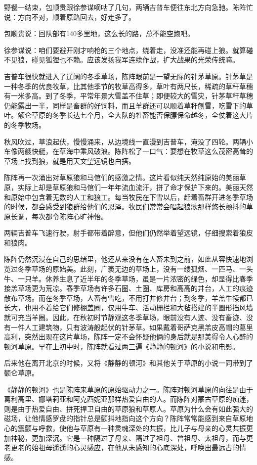 \par 野餐一结束，包顺贵跟徐参谋嘀咕了几句，两辆吉普车便往东北方向急驰。陈阵忙说：方向不对，顺着原路回去，好走多了。
\par 包顺贵说：回队部有140多里地，这么长的路，总不能空跑吧。
\par 徐参谋说：咱们要避开刚才响枪的三个地点，绕着走，没准还能再碰上狼。就算碰不见狼，碰见狐狸也不赖。应该发扬我军连续作战，扩大战果的光荣传统嘛。
\par 吉普车很快就进入了辽阔的冬季草场，陈阵眼前是一望无际的针茅草原。针茅草是一种冬季的优良牧草，比其他季节的牧草高得多，草叶有两尺长，稀疏的草秆草穗有一米多高。到了冬季，平常年景大雪盖不住草；即便较大的雪灾，针茅草秆草穗仍能露出一半，同样是畜群的好饲料，而且羊群还可以顺着草秆刨雪，吃雪下的草叶。额仑草原的冬季长达七个月，全大队的牲畜能否保膘保命越冬，全仗着这大片的冬季牧场。
\par 秋风吹过，草浪起伏，慢慢涌来，从边境线一直漫到吉普车，淹没了四轮。两辆小车像两艘快艇，在草海中乘风破浪。陈阵松了一口气：要想在牧草这么茂密高耸的草场上找到狼，就是用天文望远镜也白搭。
\par 陈阵再一次涌出对草原狼和马倌们的感激之情。这片看似纯天然纯原始的美丽草原，实际上却是草原狼和马倌们一年年流血流汗，拼了命才保护下来的。美丽天然和原始中包含着无数的人工和狼工。每当牧民在下雪以后，赶着畜群开进冬季草场的时候，都会感受到狼群给他们的恩泽。牧民们常常会唱起狼歌那样悠长颤抖的草原长调，每次都令陈阵心旷神怡。
\par 两辆吉普车飞速行驶，射手都带着醉意，但他们仍然举着望远镜，仔细搜索着狼皮和狼肉。
\par 陈阵仍然沉浸在自己的思绪里，他还从来没有在人畜未到之前，如此从容快速地浏览过冬季草场的原始美。此刻，广袤无边的草场上，没有一缕孤烟、一匹马、一头牛、一只羊。休养生息了近半年的冬季草场，虽是一片浓密的绿色，却显得比春季接羔草场更为荒凉。春季草场有许多石圈、土圈、库房和高高的井台，人工的痕迹散布草场。而在冬季草场，人畜有雪吃，不用打井修井台；到冬季，羊羔牛犊都已长大，也用不着给它们修棚盖圈，仅用牛车、活动栅栏和大毡搭建的半圆形挡风墙就可充当羊圈。因此，在秋初时节静观这冬季草场，眼前没有人迹、没有畜迹、没有一件人工建筑物，只有波涛般起伏的针茅草。如果戴着哥萨克黑羔皮高帽的葛里高利，突然出现在这片草场，陈阵一定不会怀疑他俩的身后就是那美得令人心醉的顿河草原。早在上初中时，陈阵就看过两三遍《静静的顿河》的小说和电影。
\par 后来他在离开北京的时候，又将《静静的顿河》和其他关于草原的小说一同带到了额仑草原。
\par 《静静的顿河》也是陈阵来草原的原始驱动力之一。陈阵对顿河草原的向往是由于葛利高里、娜塔莉亚和阿克西妮亚那样热爱自由的人。而陈阵对蒙古草原的痴迷，则是由于热爱自由、拼死捍卫自由的草原狼和草原人。草原为什么会有如此强大的磁场，让他情感罗盘的指针总是颤抖地指向这个方向？陈阵常常能感到来自草原地心的震颤与呼救，使他与草原有一种灵魂深处的共振，比儿子与母亲的心灵共振更加神秘，更加深沉。它是一种隔过了母亲、隔过了祖母、曾祖母、太祖母，而与更老更老的始祖母遥遥的心灵感应，在他从未感知的心底深处，呼唤出最远古的情感。
